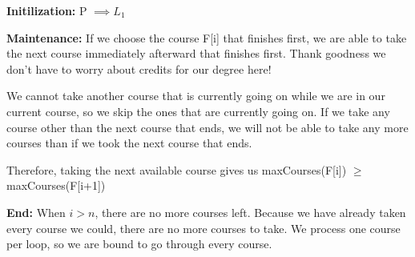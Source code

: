 \documentclass{article}
\begin{document}
{\bf Initilization:} P $\implies L_{1}$

{\bf Maintenance: } If we choose the course F[i] that finishes first, we are able to take the next course immediately afterward that finishes first. Thank goodness we don't have to worry about credits for our degree here!

We cannot take another course that is currently going on while we are in our current course, so we skip the ones that are currently going on. If we take any course other than the next course that ends, we will not be able to take any more courses than if we took the next course that ends.

Therefore, taking the next available course gives us maxCourses(F[i]) $\geq$ maxCourses(F[i+1])

{\bf End: } When $i > n$, there are no more courses left. Because we have already taken every course we could, there are no more courses to take. We process one course per loop, so we are bound to go through every course.
\end{document}
